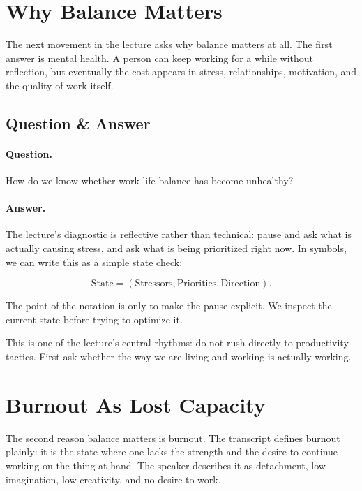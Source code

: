 \section{Why Balance Matters}

The next movement in the lecture asks why balance matters at all. The first answer is mental health. A person can keep working for a while without reflection, but eventually the cost appears in stress, relationships, motivation, and the quality of work itself.

\subsection{Question \& Answer}

\paragraph{Question.}
How do we know whether work-life balance has become unhealthy?

\paragraph{Answer.}
The lecture's diagnostic is reflective rather than technical: pause and ask what is actually causing stress, and ask what is being prioritized right now. In symbols, we can write this as a simple state check:

\begin{equation}
\mathrm{State}
=
\left(
\mathrm{Stressors},
\mathrm{Priorities},
\mathrm{Direction}
\right).
\end{equation}

The point of the notation is only to make the pause explicit. We inspect the current state before trying to optimize it.

This is one of the lecture's central rhythms: do not rush directly to productivity tactics. First ask whether the way we are living and working is actually working.

\section{Burnout As Lost Capacity}

The second reason balance matters is burnout. The transcript defines burnout plainly: it is the state where one lacks the strength and the desire to continue working on the thing at hand. The speaker describes it as detachment, low imagination, low creativity, and no desire to work.

